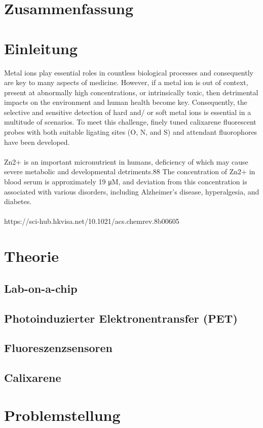 \documentclass[12pt,a4paper]{report}
\begin{document}
	\tableofcontents
	\chapter{Zusammenfassung}
	\chapter{Einleitung}
	Metal ions play essential roles in countless biological processes
	and consequently are key to many aspects of medicine.
	However, if a metal ion is out of context, present at abnormally
	high concentrations, or intrinsically toxic, then detrimental
	impacts on the environment and human health become key.
	Consequently, the selective and sensitive detection of hard and/
	or soft metal ions is essential in a multitude of scenarios. To meet
	this challenge, finely tuned calixarene fluorescent probes with both suitable ligating sites (O, N, and S) and attendant fluorophores have been developed. \\
	\ \\
	Zn2+ is an important
	micronutrient in humans, deficiency of which may cause severe
	metabolic and developmental detriments.88 The concentration
	of Zn2+ in blood serum is approximately 19 μM, and deviation
	from this concentration is associated with various disorders,
	including Alzheimer’s disease, hyperalgesia, and diabetes.\\
	\ \\
	https://sci-hub.hkvisa.net/10.1021/acs.chemrev.8b00605
	\chapter{Theorie}
	\section{Lab-on-a-chip}
	\section{Photoinduzierter Elektronentransfer (PET)}
	\section{Fluoreszenzsensoren}
	\section{Calixarene}
	\chapter{Problemstellung}
\end{document}
